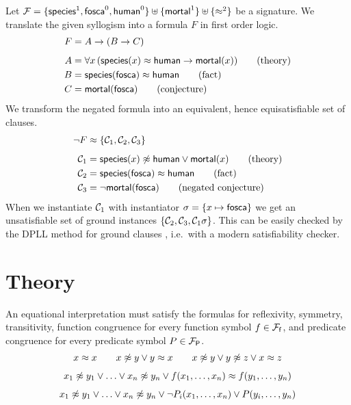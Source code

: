 \begin{example} Let ${\mathcal F} = \{\mathsf{species}^1, \mathsf{fosca}^0, \mathsf{human}^0 \} \uplus \{ \mathsf{mortal}^1  \} \uplus \{\approx^2\}$ be a signature.
	We translate the given syllogism into a formula $F$ in first order logic.
	\begin{align*}
	F &= A \rightarrow (B \rightarrow C) \\[0.5em]
	A &= \forall x\,(\mathsf{species}(x) \approx \mathsf{human} \rightarrow \mathsf{mortal}(x)) 	\tag{theory}\\
	B &= \mathsf{species}(\mathsf{fosca}) \approx \mathsf{human} 							\tag{fact}\\
	C &= \mathsf{mortal}(\mathsf{fosca})										\tag{conjecture}
	\end{align*}
%	 
	We transform the negated formula into an equivalent, hence equisatisfiable set of clauses.
%
\begin{align*}
\lnot F &\approx \{ {\mathcal C}_1, {\mathcal C}_2, {\mathcal C}_3 \} \\[0.5em]
{\mathcal C}_1 &= \mathsf{species}(x)\not\approx\mathsf{human}\lor\mathsf{mortal}(x) \tag{theory}\\
{\mathcal C}_2 &= \mathsf{species}(\mathsf{fosca})\approx\mathsf{human} \tag{fact} \\
{\mathcal C}_3 &= \lnot\mathsf{mortal}(\mathsf{fosca}) \tag{negated conjecture} \\
\end{align*}
When we instantiate ${\mathcal C}_1$ with instantiator $\sigma = \{x\mapsto\mathsf{fosca}\}$ we get an unsatisfiable 
set of ground instances $\{ {\mathcal C}_2, {\mathcal C}_3, {\mathcal C}_1\sigma  \}$.
This can be easily checked by the DPLL 
method for ground clauses \cite{Davis:1962:MPT:368273.368557, Davis:1960:CPQ:321033.321034},
i.e.~with a modern satisfiability checker.

\section{Theory}



	An equational interpretation must satisfy the formulas for reflexivity, symmetry, transitivity, 
	function congruence for every function symbol $f\in{{\mathcal F}_{\mathsf f}}$, 
	and predicate congruence for every predicate symbol $P\in{{\mathcal F}_{\mathsf P}}$.
	\[
		\begin{array}[t]{c}
		x\mEQ x 
\qquad
		x\mNE y\lor y\mEQ x
\qquad		
		x\mNE y\lor y\mNE z\lor x\mEQ z \\[0.7em]
%		
x_1 \mNE y_1\lor\ldots\lor x_n \mNE y_n\lor f(x_1,\ldots,x_n)\mEQ f(y_1,\ldots,y_n) \\[0.7em]
%
x_1\mNE y_1\lor\ldots\lor x_n\mNE y_n\lor\lnot P_i(x_1,\ldots,x_n)\lor P(y_i,\ldots,y_n)

		\end{array}
	\]







\end{example}

